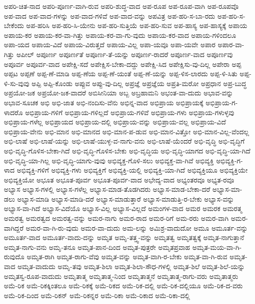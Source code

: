 {ಅಪರಿ-ಚಿತ-ನಾದ
ಅಪರಿ-ಪೂರ್ಣ-ವಾಗಿ-ರುವ
ಅಪರಿ-ಶುದ್ಧ-ವಾದ
ಅಪ-ರೂಪ
ಅಪ-ರೂಪ-ವಾಗಿ
ಅಪ-ರೂಪವೊ
ಅಪ-ವಾದ
ಅಪ-ವಾದ-ಗಳನ್ನು
ಅಪ-ವಾದ-ಗಳಿವೆ
ಅಪ-ವಾದ-ವನ್ನು
ಅಪವಿತ್ರ
ಅಪ-ಹರಿ-ಸ-ಬಾ-ರದು
ಅಪ-ಹರಿ-ಸ-ಬೇಕೆಂದು
ಅಪ-ಹರಿಸಿ
ಅಪ-ಹರಿ-ಸಿ-ಯೇನು
ಅಪ-ಹರಿ-ಸುತ್ತಿಯೆ
ಅಪ-ಹರಿ-ಸುವ
ಅಪ-ಹಾಸ್ಯ
ಅಪ-ಹಾಸ್ಯಕ್ಕೆ
ಅಪಾಯ
ಅಪಾಯ-ಕರ
ಅಪಾಯ-ಕರ-ವಾ-ಗಿತ್ತು
ಅಪಾಯ-ಕರ-ವಾ-ಗು-ವುದು
ಅಪಾಯ-ಕರ-ವಾದ
ಅಪಾಯ-ಗಳಿಂದಲೂ
ಅಪಾ-ಯದ
ಅಪಾಯ-ವಿದೆ
ಅಪಾಯ-ವಿರುತ್ತದೆ
ಅಪಾಯ-ವಿಲ್ಲ
ಅಪಾ-ಯವೂ
ಅಪಾ-ಯವೇ
ಅಪಾರ
ಅಪಾರ-ವಾ-ಗಿತ್ತು
ಅಪೀಲ್
ಅಪೂರ್ಣ
ಅಪೂರ್ಣತೆ
ಅಪೂರ್ಣ-ತೆ-ಯನ್ನು
ಅಪೂರ್ಣ-ರಾದರೆ
ಅಪೂರ್ಣ-ವಾದ
ಅಪೂರ್ಣವು
ಅಪೂರ್ವ
ಅಪೂರ್ವ-ವಾದ
ಅಪೇಕ್ಷಿ-ಸದೆ
ಅಪೇಕ್ಷಿಸ-ಬೇಕಾ-ದದ್ದು
ಅಪೇಕ್ಷಿ-ಸಿದ
ಅಪೇಕ್ಷಿಸು-ವು-ದಿಲ್ಲ
ಅಪೇರಾ
ಅಪ್ಪ
ಅಪ್ಪಟ
ಅಪ್ಪಣೆ
ಅಪ್ಪ-ಣೆ-ಮಾಡಿ
ಅಪ್ಪ-ಣೆಯ
ಅಪ್ಪ-ಣೆ-ಯಂತೆ
ಅಪ್ಪ-ಣೆ-ಯನ್ನು
ಅಪ್ಪ-ಳಿಸ-ಲಾರದು
ಅಪ್ಪ-ಳಿ-ಸಿತು
ಅಪ್ಪ-ಳಿ-ಸು-ವುವು
ಅಪ್ಪಿ
ಅಪ್ಪಿ-ಕೊಂಡು
ಅಪ್ಪುವ
ಅಪ್ಪು-ವು-ದಿಲ್ಲ
ಅಪ್ರಜ್ಞೆ
ಅಪ್ರಜ್ಞೆಯ
ಅಪ್ರತಿ-ಮರೋ
ಅಪ್ರಧಾನ
ಅಪ್ರ-ಬುದ್ಧ
ಅಪ್ರಯೋ-ಜಕ
ಅಪ್ರಯೋ-ಜಕ-ವಾದರೆ
ಅಬಿಸೀನಿಯಾ
ಅಬ್ಬ
ಅಬ್ರಹಾಮನಿ
ಅಭಂತ-ವಾ-ದುದು
ಅಭಾವ-ವನ್ನು
ಅಭಾವ-ಸೂಚಕ
ಅಭಿ
ಅಭಿ-ಜಾತ
ಅಭಿ-ನಂದಿಸು-ವೆನು
ಅಭಿನ್ನ-ವಾದ
ಅಭಿಪ್ರಾಯ
ಅಭಿಪ್ರಾಯಕ್ಕೆ
ಅಭಿಪ್ರಾಯ-ಗ-ಳಾದರೊ
ಅಭಿಪ್ರಾಯ-ಗಳಿಗೆ
ಅಭಿಪ್ರಾಯ-ಗಳಿಲ್ಲದೆ
ಅಭಿಪ್ರಾಯ-ಗಳಿವೆ
ಅಭಿಪ್ರಾಯ-ಗಳು
ಅಭಿಪ್ರಾಯ-ಗಳುಳ್ಳವು
ಅಭಿಪ್ರಾಯ-ಗಳೆಲ್ಲ
ಅಭಿಪ್ರಾಯದ
ಅಭಿಪ್ರಾಯ-ದಲ್ಲಿ
ಅಭಿಪ್ರಾಯ-ವನ್ನು
ಅಭಿಪ್ರಾಯ-ವಲ್ಲ
ಅಭಿಪ್ರಾಯ-ವಿದೆ
ಅಭಿಪ್ರಾಯ-ವೇನು
ಅಭಿ-ಮಾನ
ಅಭಿ-ಮಾನದ
ಅಭಿ-ಮಾನ-ಪ-ಡುವ
ಅಭಿ-ಮಾನ-ವಿತ್ತೋ
ಅಭಿ-ಮಾನ-ವಿಲ್ಲ-ವೆಂದಲ್ಲ
ಅಭಿ-ಲಾಷೆ
ಅಭಿ-ಲಾಷೆ-ಯನ್ನು
ಅಭಿ-ಲಾಷೆ-ಯುಳ್ಳ-ವ-ನಾಗು-ವನು
ಅಭಿ-ಲಾಷೆ-ಯೆಂದರೆ
ಅಭಿ-ವೃದ್ಧಿ
ಅಭಿ-ವೃದ್ಧಿಗೆ
ಅಭಿ-ವೃದ್ಧಿ-ಗೊಳಿಸ-ಬೇಕಾ-ಗಿದೆ
ಅಭಿ-ವೃದ್ಧಿ-ಗೊಳಿಸ-ಬೇಕು
ಅಭಿ-ವೃದ್ಧಿಯ
ಅಭಿ-ವೃದ್ಧಿ-ಯಾಗದ
ಅಭಿ-ವೃದ್ಧಿ-ಯಾ-ಗಿದೆ
ಅಭಿ-ವೃದ್ಧಿ-ಯಾ-ಗಿಲ್ಲ
ಅಭಿ-ವೃದ್ಧಿ-ಯಾಗು-ವುವು
ಅಭಿವ್ಯಕ್ತ-ಗೊಳಿ-ಸಲು
ಅಭಿವ್ಯಕ್ತ-ವಾ-ಗಿವೆ
ಅಭಿವ್ಯಕ್ತಿ
ಅಭಿವ್ಯಕ್ತಿ-ಗ-ಳಾದ
ಅಭಿವ್ಯಕ್ತಿ-ಗಳಿಗೆ
ಅಭಿವ್ಯಕ್ತಿ-ಗಳು
ಅಭಿವ್ಯಕ್ತಿಗೆ
ಅಭಿವ್ಯಕ್ತಿ-ಯಲ್ಲಿ
ಅಭಿವ್ಯಕ್ತಿ-ಯಾ-ಗಿದೆ
ಅಭಿವ್ಯಕ್ತಿಯೂ
ಅಭಿವ್ಯಕ್ತಿಯೇ
ಅಭಿವ್ಯಕ್ತಿಯೋ
ಅಭೂತ
ಅಭೂತ-ಪೂರ್ವ
ಅಭೂತ-ಪೂರ್ವ-ವಾದ
ಅಭೇದ್ಯ-ವಾದ
ಅಭ್ಯಂತರವೂ
ಅಭ್ಯತ-ರವೂ
ಅಭ್ಯಾಸ
ಅಭ್ಯಾಸ-ಗಳಲ್ಲಿ
ಅಭ್ಯಾಸ-ಗಳೆಲ್ಲ
ಅಭ್ಯಾಸ-ಮಾಡ-ತೊಡಗಿದರು
ಅಭ್ಯಾಸ-ಮಾಡ-ಬೇಕಾ-ದರೆ
ಅಭ್ಯಾಸ-ಮಾ-ಡಲು
ಅಭ್ಯಾಸ-ಮಾಡಿ
ಅಭ್ಯಾಸ-ಮಾಡಿ-ದರೆ
ಅಭ್ಯಾಸ-ಮಾಡುತ್ತಾರೆ
ಅಭ್ಯಾಸ-ಮಾಡುತ್ತಿ-ರ-ಬೇಕು
ಅಭ್ಯಾಸ-ವನ್ನು
ಅಭ್ಯಾಸ-ವಾ-ಗಿದೆ
ಅಭ್ಯಾಸ-ವಿದೆಯೊ
ಅಭ್ಯಾಸ-ವಿಲ್ಲ
ಅಭ್ಯಾಸ-ವಿಲ್ಲದೆ
ಅಮಂಗಳ-ವಾದ
ಅಮರ
ಅಮರಕ
ಅಮರತ್ಮ
ಅಮರತ್ವ
ಅಮರತ್ವದ
ಅಮರತ್ವ-ವನ್ನು
ಅಮರ-ನಾಗು
ಅಮರ-ರಾದ
ಅಮರ-ರಿಗೆ
ಅಮ-ರರು
ಅಮರ-ವಾಗಿ
ಅಮರ-ವಾಗಿದ್ದರೆ
ಅಮರ-ವಾ-ಗಿ-ರು-ವುದು
ಅಮರ-ವಾ-ದುದು
ಅಮ-ಲನ್ನು
ಅಮಿಶ್ರ-ವಾದುದೋ
ಅಮೂ
ಅಮೂರ್ತ-ವನ್ನು
ಅಮೂರ್ತ-ವಾದ
ಅಮೂರ್ತ-ವಾದು-ದನ್ನು
ಅಮೃತ
ಅಮೃ-ತತ್ತ್ವ-ವನ್ನು
ಅಮೃತತ್ವ
ಅಮೃತತ್ವಕ್ಕೆ
ಅಮೃತ-ನಾಗುತ್ತಾನೆ
ಅಮೃತ-ನಾಗು-ವನು
ಅಮೃ-ತನೂ
ಅಮೃತ-ಪಾನ-ದಿಂದ
ಅಮೃತ-ಪುತ್ರರೇ
ಅಮೃತಪ್ರವಾಹ
ಅಮೃತ-ಮಯ-ವಾ-ಗಿ-ರುವುದೊ
ಅಮೃತ-ರಾಗಿ
ಅಮೃತ-ರಾಗು-ವೆವು
ಅಮೃತ-ವನ್ನು
ಅಮೃತ-ವಾಗಿ-ರ-ಬೇಕು
ಅಮೃತ-ವಾ-ಗಿ-ರುವ
ಅಮೃತ-ವಾದ
ಅಮೃತ-ವಾದುದು
ಅಮೃ-ತವು
ಅಮೃತ-ಶಿಲಾ
ಅಮೃತ-ಶಿಲಾ-ಸೌಧ-ಗಳಲ್ಲಿ
ಅಮೃತ-ಶಿಲೆ
ಅಮೃತ-ಶಿಲೆ-ಯನ್ನು
ಅಮೃತಸ್ವ-ರೂಪ-ವಾದುದು
ಅಮೃತಾತ್ಮ
ಅಮೃತಾತ್ಮ-ನಿಂದ
ಅಮೃತಾತ್ಮನೆ
ಅಮೃತಾತ್ಮ-ರಾಗು-ವರು
ಅಮೃತಾತ್ಮರು
ಅಮೆ-ರಿಕ
ಅಮೆ-ರಿಕಕ್ಕಿಂತಲೂ
ಅಮೆ-ರಿಕಕ್ಕೆ
ಅಮೆ-ರಿಕದ
ಅಮೆ-ರಿಕ-ದಲ್ಲಿ
ಅಮೆ-ರಿಕ-ದಲ್ಲಿಯೂ
ಅಮೆ-ರಿಕ-ದ-ವರು
ಅಮೆ-ರಿಕ-ದಿಂದ
ಅಮೆ-ರಿಕನ್
ಅಮೆ-ರಿಕನ್ನರ
ಅಮೆ-ರಿಕಾ
ಅಮೆ-ರಿಕಾದ
ಅಮೆ-ರಿಕಾ-ದಲ್ಲಿ
}
